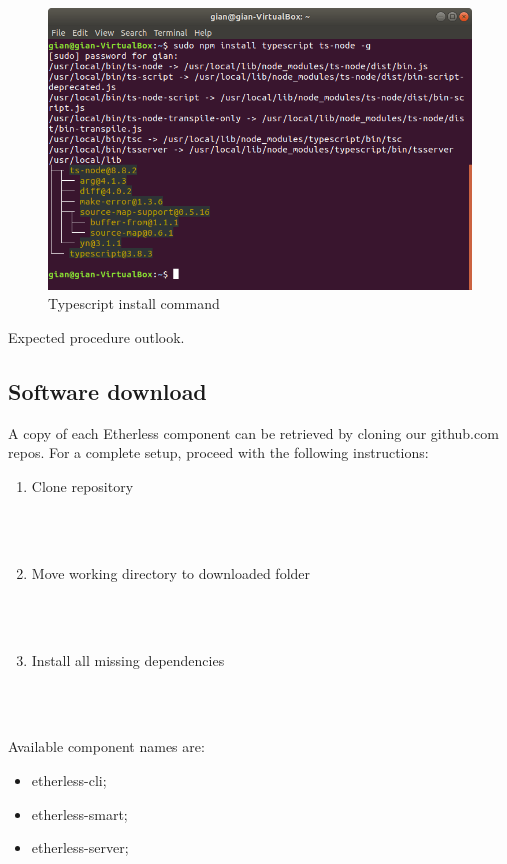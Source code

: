 \begin{figure}[h]
	\centering
	\includegraphics[width=\textwidth]{res/img/typescriptInstall.png}
	\caption{Typescript install command}
\end{figure}
Expected procedure outlook.
\newpage
\subsection{Software download}
A copy of each Etherless component can be retrieved by cloning our github.com repos. For a complete setup, proceed with the following instructions:
\begin{enumerate}
	\item Clone repository \\\\\centerline{}\\
	\item Move working directory to downloaded folder \\\\\centerline{}\\
	\item Install all missing dependencies \\\\\centerline{}\\
\end{enumerate}
Available component names are:
\begin{itemize}
	\item etherless-cli;
	\item etherless-smart;
	\item etherless-server;
\end{itemize}
